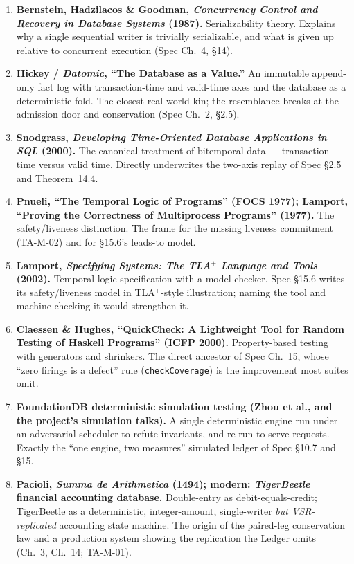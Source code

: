 \documentclass[11pt,a4paper]{article}
\begin{document}
\begin{enumerate}[leftmargin=1.6em,itemsep=2pt]
\item \textbf{Bernstein, Hadzilacos \& Goodman, \emph{Concurrency Control and Recovery in
Database Systems} (1987).} Serializability theory. Explains why a single sequential writer is
trivially serializable, and what is given up relative to concurrent execution (Spec Ch.~4, §14).

\item \textbf{Hickey / \emph{Datomic}, ``The Database as a Value.''} An immutable append-only
fact log with transaction-time and valid-time axes and the database as a deterministic fold. The
closest real-world kin; the resemblance breaks at the admission door and conservation (Spec
Ch.~2, §2.5).

\item \textbf{Snodgrass, \emph{Developing Time-Oriented Database Applications in SQL} (2000).}
The canonical treatment of bitemporal data --- transaction time versus valid time. Directly
underwrites the two-axis replay of Spec §2.5 and Theorem~14.4.

\item \textbf{Pnueli, ``The Temporal Logic of Programs'' (FOCS 1977); Lamport, ``Proving the
Correctness of Multiprocess Programs'' (1977).} The safety/liveness distinction. The frame for
the missing liveness commitment (TA-M-02) and for §15.6's leads-to model.

\item \textbf{Lamport, \emph{Specifying Systems: The TLA$^{+}$ Language and Tools} (2002).}
Temporal-logic specification with a model checker. Spec §15.6 writes its safety/liveness model in
TLA$^{+}$-style illustration; naming the tool and machine-checking it would strengthen it.

\item \textbf{Claessen \& Hughes, ``QuickCheck: A Lightweight Tool for Random Testing of Haskell
Programs'' (ICFP 2000).} Property-based testing with generators and shrinkers. The direct
ancestor of Spec Ch.~15, whose ``zero firings is a defect'' rule (\texttt{checkCoverage}) is the
improvement most suites omit.

\item \textbf{FoundationDB deterministic simulation testing (Zhou et al., and the project's
simulation talks).} A single deterministic engine run under an adversarial scheduler to refute
invariants, and re-run to serve requests. Exactly the ``one engine, two measures'' simulated
ledger of Spec §10.7 and §15.

\item \textbf{Pacioli, \emph{Summa de Arithmetica} (1494); modern: \emph{TigerBeetle}
financial accounting database.} Double-entry as debit-equals-credit; TigerBeetle as a
deterministic, integer-amount, single-writer \emph{but VSR-replicated} accounting state machine.
The origin of the paired-leg conservation law and a production system showing the replication the
Ledger omits (Ch.~3, Ch.~14; TA-M-01).


\end{enumerate}
\end{document}
